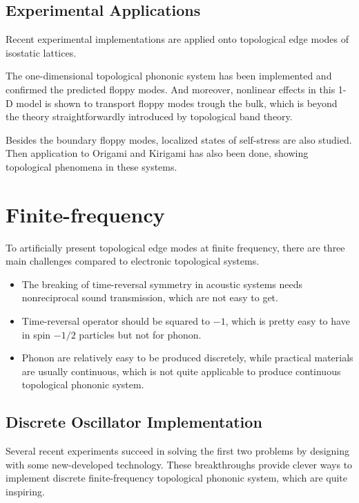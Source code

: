 \documentclass[aps,pre,preprint,groupedaddress]{revtex4-1}
\begin{document}
\subsection{Experimental Applications}

Recent experimental implementations are applied onto topological edge modes of isostatic lattices.

The one-dimensional topological phononic system has been implemented and confirmed the predicted floppy modes\cite{cite-key19}. And moreover, nonlinear effects in this 1-D model is shown to transport floppy modes trough the bulk\cite{cite-key20}, which is beyond the theory straightforwardly introduced by topological band theory.

Besides the boundary floppy modes, localized states of self-stress are also studied\cite{cite-key21}. Then application to Origami and Kirigami has also been done, showing topological phenomena in these systems\cite{cite-key22}.

\section{Finite-frequency}

To artificially present topological edge modes at finite frequency, there are three main challenges compared to electronic topological systems.
\begin{itemize}
\item The breaking of time-reversal symmetry in acoustic systems needs nonreciprocal sound transmission, which are not easy to get.
\item Time-reversal operator should be squared to $-1$, which is pretty easy to have in spin $-1/2$ particles but not for phonon.
\item Phonon are relatively easy to be produced discretely, while practical materials are usually continuous, which is not quite applicable to produce continuous topological phononic system.
\end{itemize}

\subsection{Discrete Oscillator Implementation}

Several recent experiments succeed in solving the first two problems by designing with some new-developed technology. These breakthroughs provide clever ways to implement discrete finite-frequency topological phononic system, which are quite inspiring.
\end{document}
